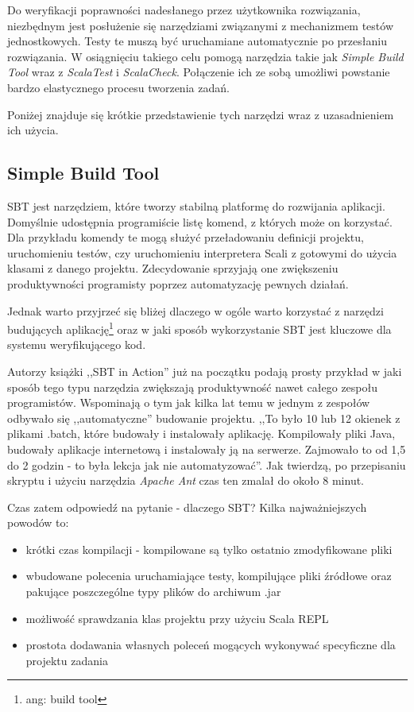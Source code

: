 \documentclass[brudnopis]{xmgr}
\begin{document}
Do weryfikacji poprawności nadesłanego przez użytkownika rozwiązania, niezbędnym jest posłużenie się narzędziami związanymi z mechanizmem testów jednostkowych. Testy te muszą być uruchamiane automatycznie po przesłaniu rozwiązania. W osiągnięciu takiego celu pomogą narzędzia takie jak \textit{Simple Build Tool} wraz z \textit{ScalaTest} i \textit{ScalaCheck}. Połączenie ich ze sobą umożliwi powstanie bardzo elastycznego procesu tworzenia zadań. 

Poniżej znajduje się krótkie przedstawienie tych narzędzi wraz z uzasadnieniem ich użycia.

\subsection{Simple Build Tool}

SBT jest narzędziem, które tworzy stabilną platformę do rozwijania aplikacji. Domyślnie udostępnia programiście listę komend, z których może on korzystać. Dla przykładu komendy te mogą służyć przeładowaniu definicji projektu, uruchomieniu testów, czy uruchomieniu interpretera Scali z gotowymi do użycia klasami z danego projektu. Zdecydowanie sprzyjają one zwiększeniu produktywności programisty poprzez automatyzację pewnych działań.

Jednak warto przyjrzeć się bliżej dlaczego w ogóle warto korzystać z narzędzi budujących aplikację\footnote{ang: build tool} oraz w jaki sposób wykorzystanie SBT jest kluczowe dla systemu weryfikującego kod. 

Autorzy książki ,,SBT in Action'' już na początku podają prosty przykład w jaki sposób tego typu narzędzia zwiększają produktywność nawet całego zespołu programistów. Wspominają o tym jak kilka lat temu w jednym z zespołów odbywało się ,,automatyczne'' budowanie projektu. ,,To było 10 lub 12 okienek z plikami .batch, które budowały i instalowały aplikację. Kompilowały pliki Java, budowały aplikacje internetową i instalowały ją na serwerze. Zajmowało to od 1,5 do 2 godzin - to była lekcja jak nie automatyzować''.\cite[s.1]{Suereth:2014:SIA} Jak twierdzą, po przepisaniu skryptu i użyciu narzędzia \emph{Apache Ant} czas ten zmalał do około 8 minut.

Czas zatem odpowiedź na pytanie - dlaczego SBT? Kilka najważniejszych powodów to:
\begin{itemize}
\item krótki czas kompilacji - kompilowane są tylko ostatnio zmodyfikowane pliki
\item wbudowane polecenia uruchamiające testy, kompilujące pliki źródłowe oraz pakujące poszczególne typy plików do archiwum .jar
\item możliwość sprawdzania klas projektu przy użyciu Scala REPL
\item prostota dodawania własnych poleceń mogących wykonywać specyficzne dla projektu zadania   
\end{itemize}
\end{document}
